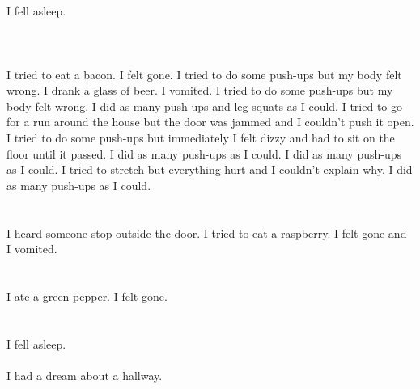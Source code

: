 \documentclass{article}
\begin{document}
    \section{}
    I fell asleep.\\\\ 
    \newpage
    
    \section{}
    I tried to eat a bacon. I felt gone. I tried to do some push-ups but my body felt wrong. I drank a glass of beer. I vomited.  I tried to do some push-ups but my body felt wrong.  I did as many push-ups and leg squats as I could.  I tried to go for a run around the house but the door was jammed and I couldn't push it open.  I tried to do some push-ups but immediately I felt dizzy and had to sit on the floor until it passed.   I did as many push-ups as I could.  I did as many push-ups as I could.  I tried to stretch but everything hurt and I couldn't explain why.  I did as many push-ups as I could.  
    \newpage
    
    \section{}
    I heard someone stop outside the door. I tried to eat a raspberry. I felt gone and I vomited.  
    \newpage
    
    \section{}
    I ate a green pepper. I felt gone.  
    \newpage
    
    \section{}
    I fell asleep.\\\\I had a dream about a hallway.\\\\ 
    \newpage
    
\end{document}
